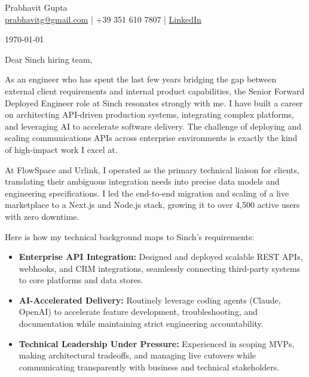 \documentclass{article}
\newcommand{\namesection}[3]{\begin{center}\Huge #2\\[1ex]\large #3\end{center}\vspace{1cm}}
\newcommand{\currentdate}[1]{\begin{flushright}#1\end{flushright}\vspace{0.5cm}}
\newcommand{\lettercontent}[1]{#1\vspace{1ex}\par}
\begin{document}
\namesection{}{\Huge{Prabhavit Gupta}}{  \href{mailto:prabhavitg@gmail.com}{prabhavitg@gmail.com} | +39 351 610 7807 |  \urlstyle{same}\href{https://www.linkedin.com/in/prabhavit/}{LinkedIn}
}


\currentdate{\today}
\lettercontent{Dear Sinch hiring team,}

\lettercontent{As an engineer who has spent the last few years bridging the gap between external client requirements and internal product capabilities, the Senior Forward Deployed Engineer role at Sinch resonates strongly with me. I have built a career on architecting API-driven production systems, integrating complex platforms, and leveraging AI to accelerate software delivery. The challenge of deploying and scaling communications APIs across enterprise environments is exactly the kind of high-impact work I excel at.}

\lettercontent{At FlowSpace and Urlink, I operated as the primary technical liaison for clients, translating their ambiguous integration needs into precise data models and engineering specifications. I led the end-to-end migration and scaling of a live marketplace to a Next.js and Node.js stack, growing it to over 4,500 active users with zero downtime.}

\lettercontent{Here is how my technical background maps to Sinch's requirements:}

{\raggedright\fontsize{11pt}{13pt}\selectfont
\begin{itemize}
    \item \textbf{Enterprise API Integration:} Designed and deployed scalable REST APIs, webhooks, and CRM integrations, seamlessly connecting third-party systems to core platforms and data stores.
    \item \textbf{AI-Accelerated Delivery:} Routinely leverage coding agents (Claude, OpenAI) to accelerate feature development, troubleshooting, and documentation while maintaining strict engineering accountability.
    \item \textbf{Technical Leadership Under Pressure:} Experienced in scoping MVPs, making architectural tradeoffs, and managing live cutovers while communicating transparently with business and technical stakeholders.
\end{itemize}\par}
\vspace{6pt}
\end{document}
